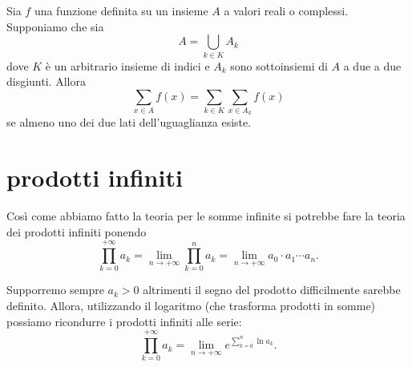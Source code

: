 \begin{comment}
\begin{theorem}[somme più che numerabili]
  Sia $f$ una funzione definita su un insieme $A$
  a valori reali o complessi. Se $f$ è sommabile
  su $A$ allora l'insieme
  \[
    \ENCLOSE{x\in A\colon f(x)\neq 0}
  \]
  è al più numerabile.
\end{theorem}
%
\begin{proof}
Supponiamo dapprima che $f$ abbia valori reali.
Se l'insieme $\ENCLOSE{f\neq 0}$ fosse più che numerabile almeno uno dei due insiemi $\ENCLOSE{f>0}$ o $\ENCLOSE{f<0}$
sarebbe più che numerabile.
Senza perdita di generalità possiamo supporre che sia
il primo cioè che $A_+ = \ENCLOSE{x \in A\colon f(x)>0}$
sia più che numerabile. Considero allora per ogni $n\in \NN$
gli insiemi $A_n = \ENCLOSE{x\in A\colon \frac 1 {f(x)} \in (n,n+1]}$. Almeno uno di questi insiemi
deve essere infinito perché se gli $A_n$ fossero
tutti finiti allora l'insieme $A=\bigcup_n A_n$ sarebbe
numerabile. Dunque esiste $N\in \NN$ tale che $A_N$ è infinito.
Posto $\eps = \frac{1}{N+1}>0$
esistono dunque $x_0,x_1, \dots, x_k, \dots$ infiniti punti di $A$ tali che $f(x_k) \ge \eps$.

***DUBBIO*** Se $A$ è più che numerabile
esiste $A_n$ finito tale che $A_n\to A$?
\end{proof}
\end{comment}

\begin{theorem}
Sia $f$ una funzione definita su un insieme $A$ a
valori reali o complessi. Supponiamo che sia
\[
  A = \bigcup_{k\in K} A_k
\]
dove $K$ è un arbitrario insieme di indici e
$A_k$ sono sottoinsiemi di $A$ a due a due disgiunti.
Allora
\[
  \sum_{x\in A} f(x) = \sum_{k\in K} \sum_{x\in A_k} f(x)
\]
se almeno uno dei due lati dell'uguaglianza esiste.
\end{theorem}

\section{prodotti infiniti}

Così come abbiamo fatto la teoria per le somme infinite si potrebbe fare
la teoria dei prodotti infiniti ponendo
\[
  \prod_{k=0}^{+\infty} a_k = \lim_{n\to +\infty} \prod_{k=0}^n a_k
  = \lim_{n\to +\infty} a_0 \cdot a_1 \cdots a_n.
\]

Supporremo sempre $a_k>0$ altrimenti il segno del prodotto difficilmente
sarebbe definito.
Allora, utilizzando il logaritmo (che trasforma prodotti in somme) possiamo
ricondurre i prodotti infiniti
alle serie:
\[
  \prod_{k=0}^{+\infty} a_k = \lim_{n\to +\infty} e^{\sum_{k=0}^n \ln a_k}.
\]

